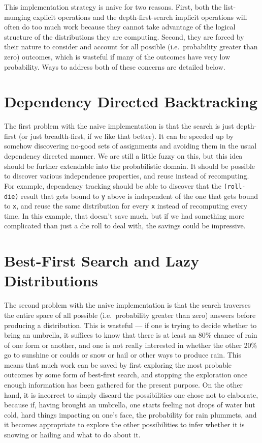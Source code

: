 \documentclass[12pt]{article}
\newcommand{\code}[1]{\texttt{#1}}
\begin{document}
This implementation strategy is naive for two reasons.  First, both
the list-munging explicit operations and the depth-first-search
implicit operations will often do too much work because they cannot
take advantage of the logical structure of the distributions they are
computing.  Second, they are forced by their nature to consider and
account for all possible (i.e.\ probability greater than zero)
outcomes, which is wasteful if many of the outcomes have very low
probability.  Ways to address both of these concerns are detailed
below.

\section{Dependency Directed Backtracking}
\label{ddb}

The first problem with the naive implementation is that the search is
just depth-first (or just breadth-first, if we like that better).  It
can be speeded up by somehow discovering no-good sets of assignments
and avoiding them in the usual dependency directed manner.  We are
still a little fuzzy on this, but this idea should be further
extendable into the probabilistic domain.  It should be possible to
discover various independence properties, and reuse instead of
recomputing.  For example, dependency tracking should be able to
discover that the \code{(roll-die)} result that gets bound to \code{y}
above is independent of the one that gets bound to \code{x}, and reuse
the same distribution for every \code{x} instead of recomputing every
time.  In this example, that doesn't save much, but if we had
something more complicated than just a die roll to deal with, the
savings could be impressive.

\section{Best-First Search and Lazy Distributions}
\label{lazy}

The second problem with the naive implementation is that the search
traverses the entire space of all possible (i.e.\ probability greater
than zero) answers before producing a distribution.  This is wasteful
--- if one is trying to decide whether to bring an umbrella, it
suffices to know that there is at least an 80\% chance of rain of one
form or another, and one is not really interested in whether the other
20\% go to sunshine or coulds or snow or hail or other ways to produce
rain.  This means that much work can be saved by first exploring the
most probable outcomes by some form of best-first search, and stopping
the exploration once enough information has been gathered for the
present purpose.  On the other hand, it is incorrect to simply discard
the possibilities one chose not to elaborate, because if, having
brought an umbrella, one starts feeling not drops of water but cold,
hard things impacting on one's face, the probability for rain
plummets, and it becomes appropriate to explore the other
possibilities to infer whether it is snowing or hailing and what to do
about it.
\end{document}
